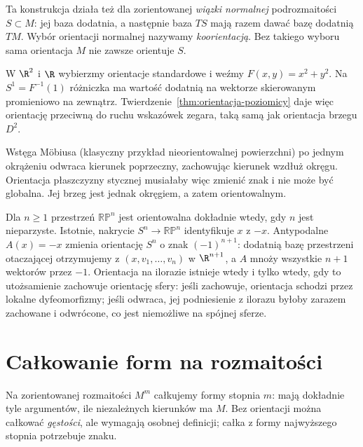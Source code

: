 Ta konstrukcja działa też dla zorientowanej
\emph{wiązki normalnej} podrozmaitości $S\subset M$:
jej baza dodatnia, a następnie baza $TS$ mają razem
dawać bazę dodatnią $TM$. Wybór orientacji normalnej
nazywamy \emph{koorientacją}. Bez takiego wyboru sama
orientacja $M$ nie zawsze orientuje $S$.

\begin{przyklad}
W $\R^2$ i $\R$ wybierzmy orientacje standardowe
i weźmy $F(x,y)=x^2+y^2$. Na $S^1=F^{-1}(1)$
różniczka ma wartość dodatnią na wektorze
skierowanym promieniowo na zewnątrz.
Twierdzenie~\ref{thm:orientacja-poziomicy} daje więc
orientację przeciwną do ruchu wskazówek zegara,
taką samą jak orientacja brzegu $D^2$.
\end{przyklad}

\begin{przyklad}
Wstęga Möbiusa (klasyczny przykład nieorientowalnej powierzchni)
po jednym okrążeniu odwraca
kierunek poprzeczny, zachowując kierunek
wzdłuż okręgu. Orientacja płaszczyzny stycznej
musiałaby więc zmienić znak i nie może być globalna.
Jej brzeg jest jednak okręgiem, a zatem orientowalnym.

Dla $n\geq1$ przestrzeń $\mathbb{RP}^n$ jest
orientowalna dokładnie wtedy, gdy $n$ jest nieparzyste.
Istotnie, nakrycie $S^n\to\mathbb{RP}^n$ identyfikuje
$x$ z $-x$. Antypodalne $A(x)=-x$ zmienia orientację
$S^n$ o znak $(-1)^{n+1}$: dodatnią bazę przestrzeni otaczającej
otrzymujemy z $(x,v_1,\ldots,v_n)$ w $\R^{n+1}$,
a $A$ mnoży wszystkie $n+1$ wektorów przez $-1$.
Orientacja na ilorazie istnieje wtedy i tylko wtedy,
gdy to utożsamienie zachowuje orientację sfery:
jeśli zachowuje, orientacja schodzi przez lokalne
dyfeomorfizmy; jeśli odwraca, jej podniesienie z
ilorazu byłoby zarazem zachowane i odwrócone, co
jest niemożliwe na spójnej sferze.
\end{przyklad}
\section{Całkowanie form na rozmaitości}
\label{sec:formy-calkowanie}

Na zorientowanej rozmaitości $M^m$ całkujemy formy
stopnia $m$: mają dokładnie tyle argumentów, ile
niezależnych kierunków ma $M$. Bez orientacji można
całkować \emph{gęstości}, ale wymagają osobnej definicji;
całka z formy najwyższego stopnia potrzebuje znaku.

